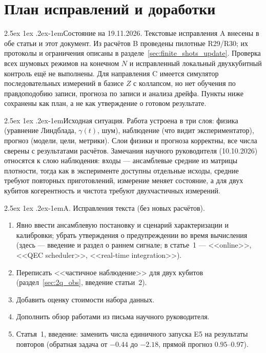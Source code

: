 \documentclass[12pt,a4paper]{report}
\makeatletter
\renewcommand\paragraph{\@startsection{paragraph}{4}{\z@}%
  {2.5ex \@plus1ex \@minus.2ex}{-1em}{\normalfont\normalsize\bfseries}}
\numberwithin{equation}{chapter}
\makeatother
\begin{document}
\chapter{План исправлений и доработки}
\label{chap:plan}
{\color{red}
\paragraph{Состояние на 19.11.2026.} Текстовые исправления A внесены в
обе статьи и этот документ. Из расчётов B проведены пилотные R29/R30;
их протоколы и ограничения описаны в разделе~\ref{sec:finite_shots_update}.
Проверка всех шумовых режимов на конечном $N$ и исправленный локальный
двухкубитный контроль ещё не выполнены. Для направления C имеется
симулятор последовательных измерений в базисе $Z$ с коллапсом, но нет
обучения по правдоподобию записи, прогноза по записи и анализа дрейфа.
Пункты ниже сохранены как план, а не как утверждение о готовом результате.

\paragraph{Исходная ситуация.} Работа устроена в три слоя: физика
(уравнение Линдблада, $\gamma(t)$, шум), наблюдение (что видит
экспериментатор), прогноз (модели, цели, метрики). Слои физики и прогноза
корректны, все числа сверены с результатами расчётов. Замечания
научного руководителя (10.10.2026) относятся к слою наблюдения: входы ---
ансамблевые средние из матрицы плотности, тогда как в эксперименте
доступны отдельные исходы, средние требуют повторных приготовлений,
измерение меняет состояние, а для двух кубитов когерентность и чистота
требуют двухчастичных измерений.

\paragraph{A. Исправления текста (без новых расчётов).}
\begin{enumerate}
\item Явно ввести ансамблевую постановку и сценарий характеризации и
      калибровки; убрать утверждения о предупреждении во время вычисления
      (здесь --- введение и раздел о раннем сигнале; в статье~1 ---
      <<online>>, <<QEC scheduler>>, <<real-time integration>>).
\item Переписать <<частичное наблюдение>> для двух кубитов
      (раздел~\ref{sec:2q_obs}, введение статьи~2).
\item Добавить оценку стоимости набора данных.
\item Дополнить обзор работами из письма научного руководителя.
\item Статья~1, введение: заменить числа единичного запуска E5 на
      результаты повторов (обратная задача от $-0.44$ до $-2.18$, прямой
      прогноз $0.95$--$0.97$).
\end{enumerate}

}
\end{document}
